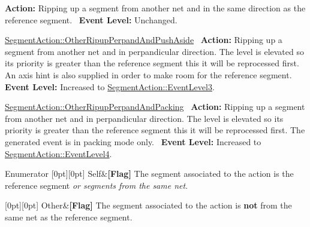 \begin{DoxyItemize}
 {\bfseries Action\+:} Ripping up a segment from another net and in the same direction as the reference segment.~\newline
 {\bfseries Event Level\+:} Unchanged.
\item \mbox{\hyperlink{classKite_1_1SegmentAction_a1d1cfd8ffb84e947f82999c682b666a7ad9caf9375b714a403e4af8a142cf9991}{Segment\+Action\+::\+Other\+Ripup\+Perpand\+And\+Push\+Aside}}~\newline
 {\bfseries Action\+:} Ripping up a segment from another net and in perpandicular direction. The level is elevated so it\textquotesingle{}s priority is greater than the reference segment this it will be reprocessed first. An axis hint is also supplied in order to make room for the reference segment.~\newline
 {\bfseries Event Level\+:} Increased to \mbox{\hyperlink{classKite_1_1SegmentAction_a1d1cfd8ffb84e947f82999c682b666a7a11ef388ea422168a9c79fd9b4d81ea34}{Segment\+Action\+::\+Event\+Level3}}.
\item \mbox{\hyperlink{classKite_1_1SegmentAction_a1d1cfd8ffb84e947f82999c682b666a7aed50f579a9e6b7ac698b2edf1a5da5c8}{Segment\+Action\+::\+Other\+Ripup\+Perpand\+And\+Packing}}~\newline
 {\bfseries Action\+:} Ripping up a segment from another net and in perpandicular direction. The level is elevated so it\textquotesingle{}s priority is greater than the reference segment this it will be reprocessed first. The generated event is in packing mode only.~\newline
 {\bfseries Event Level\+:} Increased to \mbox{\hyperlink{classKite_1_1SegmentAction_a1d1cfd8ffb84e947f82999c682b666a7ab8346062d5bbccb98893c4675b8d5098}{Segment\+Action\+::\+Event\+Level4}}. 
\end{DoxyItemize}\begin{DoxyEnumFields}{Enumerator}
[0pt][0pt]{}\mbox{\label{classKite_1_1SegmentAction_a1d1cfd8ffb84e947f82999c682b666a7aacd3ef9d889b306ca7e7bdcd37ba659a}} 
Self&{\bfseries \mbox{[}Flag\mbox{]}} The segment associated to the action is the reference segment {\itshape or segments from the same net}. \\
\hline

[0pt][0pt]{}\mbox{\label{classKite_1_1SegmentAction_a1d1cfd8ffb84e947f82999c682b666a7a75f0c3176be2226dfe8ad164a0a034a2}} 
Other&{\bfseries \mbox{[}Flag\mbox{]}} The segment associated to the action is {\bfseries not} from the same net as the reference segment. \\
\hline


\end{DoxyEnumFields}
